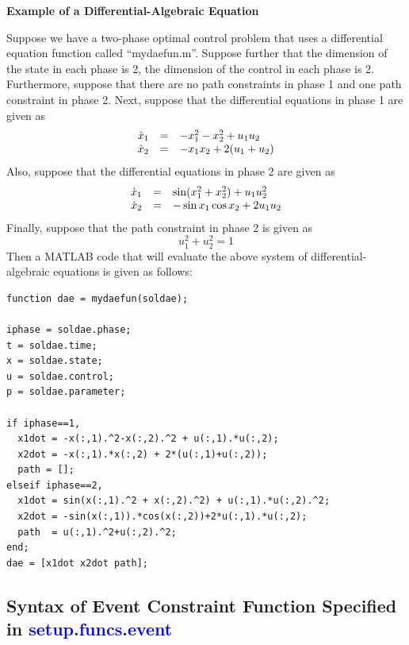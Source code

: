 \documentclass[10pt]{article}
\newenvironment{shadedframe}{%
  \def\FrameCommand{\fcolorbox{black}{shadecolor}}%
  \MakeFramed {\FrameRestore}}
{\endMakeFramed}
\newcommand{\bfblue}[1]{\textcolor{blue}{\bf #1}}
\begin{document}
\scriptsize
\begin{shadedframe}
{\noindent}{\bf Example of a Differential-Algebraic Equation}
\vspace{12pt}

Suppose we have a two-phase optimal control problem that uses a differential
equation function called ``mydaefun.m''.  Suppose further that the dimension
of the state in each phase is 2, the dimension of the control in each
phase is 2.  Furthermore, suppose that there are no path constraints
in phase 1 and one path constraint in phase 2.  Next, suppose that
the differential equations in phase 1 are given as
\begin{displaymath}
  \begin{array}{lcl}
    \dot{x}_1 & = & -x_1^2-x_2^2 + u_1 u_2 \\
    \dot{x}_2 & = & -x_1x_2 + 2(u_1+u_2)
  \end{array}
\end{displaymath}
Also, suppose that the differential equations in phase 2 are given as
\begin{displaymath}
  \begin{array}{lcl}
    \dot{x}_1 & = & \sin(x_1^2+x_2^2) + u_1 u_2^2 \\
    \dot{x}_2 & = & -\sin x_1 \cos x_2 + 2u_1u_2
  \end{array}
\end{displaymath}
Finally, suppose that the path constraint in phase 2 is given as
\begin{displaymath}
  u_1^2+u_2^2 = 1
\end{displaymath}
Then a MATLAB code that will evaluate the above system of
differential-algebraic equations is given as follows:
\begin{verbatim}
function dae = mydaefun(soldae);

iphase = soldae.phase;
t = soldae.time;
x = soldae.state;
u = soldae.control;
p = soldae.parameter;

if iphase==1,
  x1dot = -x(:,1).^2-x(:,2).^2 + u(:,1).*u(:,2);
  x2dot = -x(:,1).*x(:,2) + 2*(u(:,1)+u(:,2));
  path = [];
elseif iphase==2,
  x1dot = sin(x(:,1).^2 + x(:,2).^2) + u(:,1).*u(:,2).^2;
  x2dot = -sin(x(:,1)).*cos(x(:,2))+2*u(:,1).*u(:,2);
  path  = u(:,1).^2+u(:,2).^2;
end;
dae = [x1dot x2dot path];
\end{verbatim}
\end{shadedframe}
\normalsize

\subsection{Syntax of Event Constraint Function Specified in \bfblue{setup}.\bfblue{funcs}.\bfblue{event} \label{sect:eventSyntax}}
\end{document}
